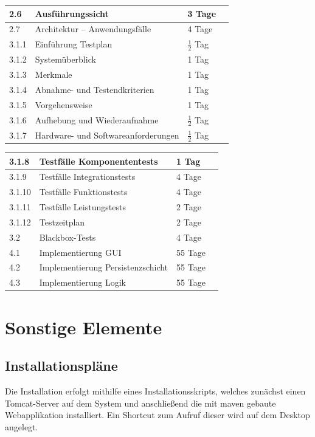 \documentclass[fontsize=12pt,paper=a4,twoside]{scrartcl}
\begin{document}
\begin{tabularx}{\textwidth}{|p{1cm}|p{5.5cm}|p{2cm}|X|}
\hline 		2.6		& Ausführungssicht						& 	3 Tage		&  \\
\hline		2.7		& Architektur -- Anwendungsfälle		&	4 Tage		&	\\
\hline		3.1.1	& Einführung Testplan					& $\frac{1}{2}$ Tag & \\
\hline 		3.1.2	& Systemüberblick						&   1 Tag		&  \\
\hline 		3.1.3	& Merkmale								&	1 Tag		&	\\
\hline 		3.1.4	& Abnahme- und Testendkriterien			&	1 Tag		&	\\
\hline 		3.1.5	& Vorgehensweise						&	1 Tag		&	\\
\hline 		3.1.6	& Aufhebung und Wiederaufnahme			& $\frac{1}{2}$ Tag	&	\\
\hline 		3.1.7	& Hardware- und Softwareanforderungen	&$\frac{1}{2}$ Tag	&	\\
\hline
\end{tabularx}\clearpage

\begin{tabularx}{\textwidth}{|p{1cm}|p{5.5cm}|p{2cm}|X|}
\hline 		3.1.8	& Testfälle Komponententests			&	1 Tag		&	\\
\hline 		3.1.9	& Testfälle Integrationstests			&	4 Tage		&	\\
\hline		3.1.10  & Testfälle Funktionstests				&	4 Tage		&	\\
\hline 		3.1.11	& Testfälle Leistungstests				&	2 Tage		&	\\
\hline 		3.1.12	& Testzeitplan							&	2 Tage		&	\\
\hline 		3.2		& Blackbox-Tests						&	4 Tage		&	\\
\hline 		4.1		& Implementierung GUI					&	55 Tage		&	\\
\hline 		4.2		& Implementierung Persistenzschicht		&	55 Tage		&	\\
\hline 		4.3		& Implementierung Logik					&	55 Tage		&	\\	
\hline
\end{tabularx}
\clearpage

\section{Sonstige Elemente}

\subsection{Installationspläne}
Die Installation erfolgt mithilfe eines Installationsskripts, welches zunächst einen Tomcat-Server auf dem System und anschließend die mit maven gebaute Webapplikation installiert. Ein Shortcut zum Aufruf dieser wird auf dem Desktop angelegt. 
\end{document}
